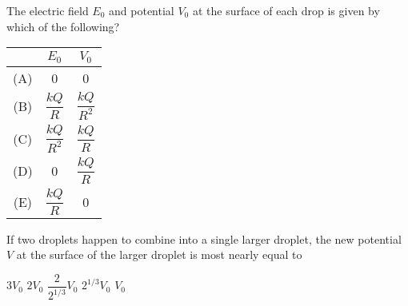 \documentclass[12pt]{../oss-classkick-exam}
\begin{document}
\begin{questions}

  \question The electric field $E_0$ and potential $V_0$ at the surface of each
  drop is given by which of the following?
  \label{rain1}
  
  \begin{tabular}{ccc}
    & $E_0$ & $V_0$ \\ \hline
    (A) & 0 & 0 \\
    (B) & $\dfrac{kQ}R$ & $\dfrac{kQ}{R^2}$ \\
    (C) & $\dfrac{kQ}{R^2}$ & $\dfrac{kQ}R$ \\
    (D) & 0 & $\dfrac{kQ}R$ \\
    (E) & $\dfrac{kQ}R$ & 0
  \end{tabular}

  \question If two droplets happen to combine into a single larger droplet, the
  new potential $V$ at the surface of the larger droplet is most nearly equal to
  \label{rain2}
  \begin{choices}
    \choice $3V_0$
    \choice $2V_0$
    \choice $\dfrac2{2^{1/3}}V_0$
    \choice $2^{1/3}V_0$
    \choice $V_0$
  \end{choices}
  
%
%  
  \uplevel{ \rule{\linewidth}{.5pt}}
  

\end{questions}
\end{document}

